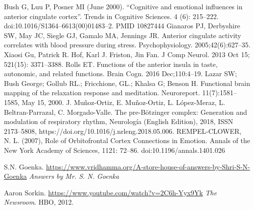 \documentclass[twocolumn]{article}
\begin{document}
Bush G, Luu P, Posner MI (June 2000). “Cognitive and emotional influences in anterior cingulate cortex”. Trends in Cognitive Sciences. 4 (6): 215–222. doi:10.1016/S1364–6613(00)01483–2. PMID 10827444
Gianaros PJ, Derbyshire SW, May JC, Siegle GJ, Gamalo MA, Jennings JR. Anterior cingulate activity correlates with blood pressure during stress. Psychophysiology. 2005;42(6):627–35.
Xiaosi Gu, Patrick R. Hof, Karl J. Friston, Jin Fan. J Comp Neurol. 2013 Oct 15; 521(15): 3371–3388.
Rolls ET. Functions of the anterior insula in taste, autonomic, and related functions. Brain Cogn. 2016 Dec;110:4–19.
Lazar SW; Bush George; Gollub RL.; Fricchione, GL.; Khalsa G; Benson H. Functional brain mapping of the relaxation response and meditation.
Neuroreport. 11(7):1581–1585, May 15, 2000.
J. Muñoz-Ortiz, E. Muñoz-Ortiz, L. López-Meraz, L. Beltran-Parrazal, C. Morgado-Valle. The pre-Bötzinger complex: Generation and modulation of respiratory rhythm, Neurología (English Edition), 2018, ISSN 2173–5808,
https://doi.org/10.1016/j.nrleng.2018.05.006.
REMPEL‐CLOWER, N. L. (2007), Role of Orbitofrontal Cortex Connections in
Emotion. Annals of the New York Academy of Sciences, 1121:
72–86. doi:10.1196/annals.1401.026


\pagebreak

\begin{thebibliography}{9}
\raggedright

  S.N. Goenka.
  \url{https://www.vridhamma.org/A-store-house-of-answers-by-Shri-S-N-Goenka}
  \textit{Answers by Mr. S. N. Goenka}

  Aaron Sorkin.
  \url{https://www.youtube.com/watch?v=2C6h-Yyx9Yk}
  \textit{The Newsroom}.
  HBO, 2012.

\end{thebibliography}
\end{document}
